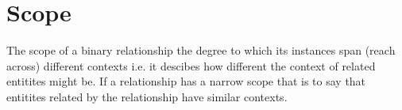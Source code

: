 
\section{Scope}
The scope of a binary relationship the degree to which its instances span (reach across) different contexts i.e. it descibes how different the context of related entitites might be. If a relationship has a narrow scope that is to say that entitites related by the relationship have similar contexts. 

